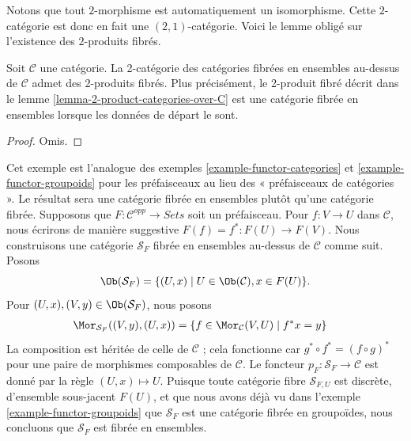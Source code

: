 \noindent
Notons que tout $2$-morphisme est automatiquement un isomorphisme.
Cette $2$-catégorie est donc en fait une $(2, 1)$-catégorie.
Voici le lemme obligé sur l'existence des $2$-produits fibrés.

\begin{lemma}
\label{lemma-2-product-categories-fibred-sets}
Soit $\mathcal{C}$ une catégorie.
La 2-catégorie des catégories fibrées en ensembles au-dessus de $\mathcal{C}$
admet des 2-produits fibrés. Plus précisément, le 2-produit fibré décrit dans le
lemme \ref{lemma-2-product-categories-over-C}
est une catégorie fibrée en ensembles lorsque les données de départ le sont.
\end{lemma}

\begin{proof}
Omis.
\end{proof}

\begin{example}
\label{example-presheaf}
Cet exemple est l'analogue des
exemples \ref{example-functor-categories} et
\ref{example-functor-groupoids}
pour les préfaisceaux au lieu des « préfaisceaux de catégories ».
Le résultat sera une catégorie fibrée en ensembles plutôt qu'une catégorie fibrée.
Supposons que $F : \mathcal{C}^{opp} \to \textit{Sets}$ soit un préfaisceau.
Pour $f : V \to U$ dans $\mathcal{C}$, nous écrirons de manière suggestive
$F(f) = f^\ast : F(U) \to F(V)$.
Nous construisons une catégorie $\mathcal{S}_F$ fibrée en ensembles au-dessus de
$\mathcal{C}$ comme suit. Posons
$$
\Ob(\mathcal{S}_F) =
\{(U, x) \mid U \in \Ob(\mathcal{C}), x \in F(U)\}.
$$
Pour $(U, x), (V, y) \in \Ob(\mathcal{S}_F)$, nous posons
\begin{align*}
\Mor_{\mathcal{S}_F}((V, y), (U, x))
& =
\{f \in \Mor_\mathcal{C}(V, U) \mid f^*x = y\}
\end{align*}
La composition est héritée de celle de $\mathcal{C}$ ; cela fonctionne car
$g^\ast \circ f^\ast = (f \circ g)^\ast$
pour une paire de morphismes composables de $\mathcal{C}$.
Le foncteur $p_F : \mathcal{S}_F \to \mathcal{C}$
est donné par la règle $(U, x) \mapsto U$.
Puisque toute catégorie fibre $\mathcal{S}_{F, U}$ est discrète, d'ensemble
sous-jacent $F(U)$, et que nous avons déjà vu dans
l'exemple \ref{example-functor-groupoids}
que $\mathcal{S}_F$ est une catégorie fibrée en groupoïdes,
nous concluons que $\mathcal{S}_F$ est fibrée en ensembles.
\end{example}

